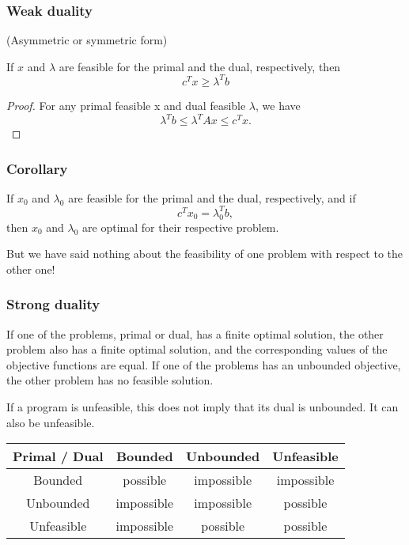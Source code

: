 \documentclass{beamer}
\begin{document}
\begin{frame}
	\frametitle{Weak duality}
	
	(Asymmetric or symmetric form)
	
	\mbox{}
	
	If $x$ and $\lambda$ are feasible for the primal and the dual, respectively, then
	\[
	c^T x \geq \lambda^T b
	\]
	
	\begin{proof}
		For any primal feasible x and dual feasible $\lambda$, we have
		\[
		\lambda^T b \leq \lambda^TAx \leq c^Tx.
		\]
	\end{proof}
	
\end{frame}

\begin{frame}
	\frametitle{Corollary}
	
	If $x_0$ and $\lambda_0$ are feasible for the primal and the dual, respectively, and if
	\[
	c^T x_0 = \lambda_0^T b,
	\]
	then $x_0$ and $\lambda_0$ are optimal for their respective problem.
	
	\mbox{}
	
	But we have said nothing about the feasibility of one problem with respect to the other one!
	
\end{frame}

\begin{frame}
	\frametitle{Strong duality}
	
	If one of the problems, primal or dual, has a finite optimal solution, the other problem also has a finite optimal solution, and the corresponding values of the objective functions are equal.
	If one of the problems has an unbounded objective, the other problem has no feasible solution.

\mbox{}

If a program is unfeasible, this does not imply that its dual is unbounded. It can also be unfeasible.

\mbox{}

\begin{center}
	\begin{tabular}{|c||c|c|c|}
		\hline
		Primal / Dual & Bounded & Unbounded & Unfeasible \\
		\hline
		\hline
		Bounded & possible & impossible & impossible \\
		\hline
		Unbounded & impossible & impossible & possible \\
		\hline
		Unfeasible & impossible & possible & possible \\
		\hline
	\end{tabular}
\end{center}

\end{frame}
\end{document}
